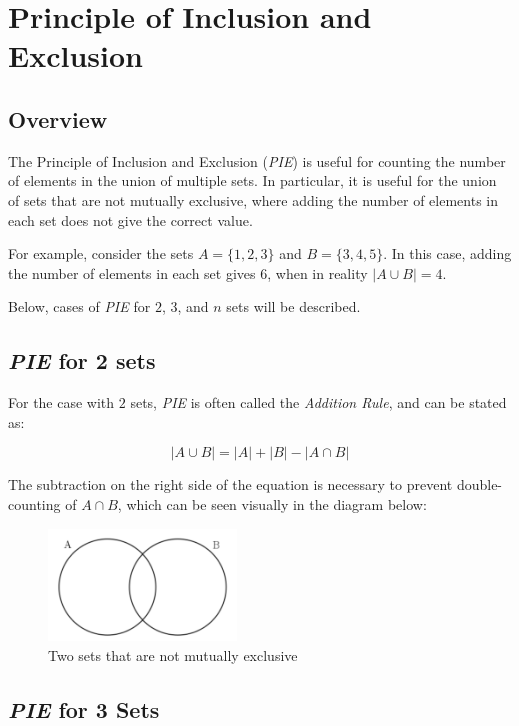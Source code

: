 \documentclass{article}
\date{}
\author{Kaan Aksoy | Feb 15, 2020}
\begin{document}
\maketitle
\section{Principle of Inclusion and Exclusion}
\subsection{Overview}

The Principle of Inclusion and Exclusion (\textit{PIE}) is 
useful for counting the number of elements in the union 
of multiple sets. In particular, it is useful for the union 
of sets that are not mutually exclusive, where adding the 
number of elements in each set does not give the correct value.

For example, consider the sets $A = \{1,2,3\}$ and $B = \{3, 4, 5\}$. In this case, adding the number of elements in each set 
gives $6$, when in reality $\lvert A \cup B \rvert = 4$. 

Below, cases of \textit{PIE} for $2$, $3$, and $n$ sets will be described.

\subsection{\textit{PIE} for 2 sets}

For the case with $2$ sets, \textit{PIE} is often called the \textit{Addition Rule}, and can be stated as:

$$ |A \cup B| = |A| + |B| - |A \cap B|$$

The subtraction on the right side of the equation is necessary 
to prevent double-counting of $A \cap B$, which can be seen visually in the diagram below:

\begin{figure}[h]
\centering
\includegraphics[width=5cm]{VennDiagram2}
\caption{Two sets that are not mutually exclusive}
\end{figure}

\subsection{\textit{PIE} for 3 Sets}
\end{document}
